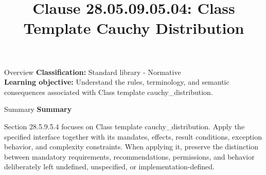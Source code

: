 \documentclass[10pt,letterpaper]{article}
\title{Clause 28.05.09.05.04: Class Template Cauchy Distribution}
\author{}
\date{}
\begin{document}
\maketitle
\begin{CornellOverviewBox}{Overview}
\textbf{Classification:} Standard library - Normative\\[2pt]
\textbf{Learning objective:} Understand the rules, terminology, and semantic consequences associated with Class template cauchy\_distribution.
\end{CornellOverviewBox}\begin{CornellSummaryBox}{Summary}
{\sffamily\bfseries\color{Accent} Summary}\par\vspace{3pt}Section 28.5.9.5.4 focuses on Class template cauchy\_distribution. Apply the specified interface together with its mandates, effects, result conditions, exception behavior, and complexity constraints. When applying it, preserve the distinction between mandatory requirements, recommendations, permissions, and behavior deliberately left undefined, unspecified, or implementation-defined.
\end{CornellSummaryBox}
\end{document}
